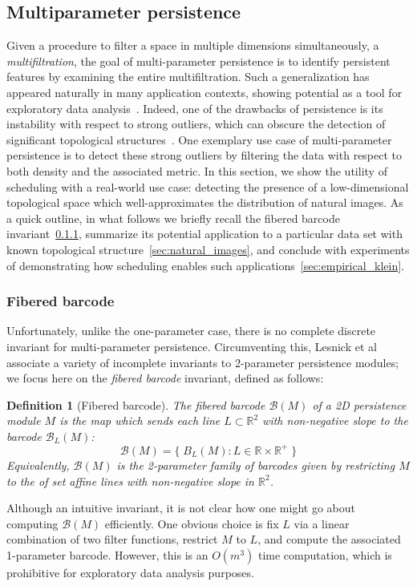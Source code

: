 \documentclass[sn-mathphys]{sn-jnl}
\newtheorem{definition}{Definition}
\begin{document}
\subsection{Multiparameter persistence}
Given a procedure to filter a space in multiple dimensions simultaneously, a \emph{multifiltration}, the goal of multi-parameter persistence is to identify persistent features by examining the entire multifiltration. 
Such a generalization has appeared naturally in many application contexts, showing potential as a tool for exploratory data analysis~\cite{lesnick2012multidimensional}. Indeed, one of the drawbacks of persistence is its instability with respect to strong outliers, which can obscure the detection of significant topological structures~\cite{buchet2015topological}.
One exemplary use case of multi-parameter persistence is to detect these strong outliers by filtering the data with respect to both density and the associated metric.
In this section, we show the utility of scheduling with a real-world use case: detecting the presence of a low-dimensional topological space which well-approximates the distribution of natural images. 
As a quick outline, in what follows we briefly recall the fibered barcode invariant~\ref{sec:fibered_barcode}, summarize its potential application to a particular data set with known topological structure~\ref{sec:natural_images}, and conclude with experiments of demonstrating how scheduling enables such applications~\ref{sec:empirical_klein}.   

\subsubsection{Fibered barcode}\label{sec:fibered_barcode}
Unfortunately, unlike the one-parameter case, there is no complete discrete invariant for multi-parameter persistence.
Circumventing this, Lesnick et al~\cite{lesnick2015interactive} associate a variety of incomplete invariants to 2-parameter persistence modules; we focus here on the \emph{fibered barcode} invariant, defined as follows: 
\begin{definition}[Fibered barcode]
	The fibered barcode $\mathcal{B}(M)$ of a 2D persistence module $M$ is the map which sends each line  $L \subset \mathbb{R}^2$ with non-negative slope to the barcode $\mathcal{B}_L(M)$: 
$$ \mathcal{B}(M) = \{ \; B_L(M) : L \in \mathbb{R} \times \mathbb{R}^{+} \; \}$$
Equivalently, $\mathcal{B}(M)$ is the 2-parameter family of barcodes given by restricting $M$ to the of set affine lines with non-negative slope in $\mathbb{R}^2$. 
\end{definition} 
\noindent Although an intuitive invariant, it is not clear how one might go about computing $\mathcal{B}(M)$ efficiently. 
One obvious choice is fix $L$ via a linear combination of two filter functions, restrict $M$ to $L$, and compute the associated 1-parameter barcode. 
However, this is an $O(m^3)$ time computation, which is prohibitive for exploratory data analysis purposes. 
\end{document}
